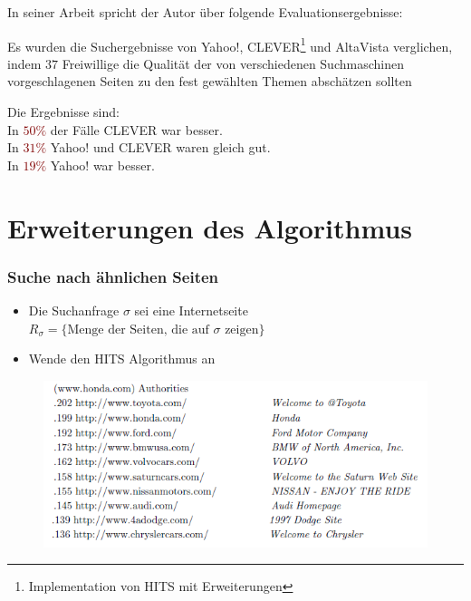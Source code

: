 \documentclass[hyperref={pdfpagelabels=false}]{beamer}
\begin{document}
\begin{frame} [allowframebreaks]
\framebreak 

\fontsize{11pt}{7.2}\selectfont
In seiner Arbeit spricht der Autor über folgende Evaluationsergebnisse:

\vspace{10pt}
Es wurden die Suchergebnisse von Yahoo!, CLEVER\footnote{Implementation von HITS mit Erweiterungen}\cite{CLEVER} und AltaVista\cite{AltaVista} verglichen, indem $37$ Freiwillige die Qualität der von verschiedenen Suchmaschinen vorgeschlagenen Seiten zu den fest gewählten Themen abschätzen sollten

\vspace{10pt}
Die Ergebnisse sind:\\
In \textcolor{maroon}{$50 \%$} der Fälle CLEVER war besser.\\
In \textcolor{maroon}{$31 \%$} Yahoo! und CLEVER waren gleich gut.\\ 
In \textcolor{maroon}{$19 \%$} Yahoo! war besser.\\ 

\end{frame}

\section{Erweiterungen des Algorithmus}

\begin{frame}
\frametitle{Suche nach ähnlichen Seiten}
\begin{itemize}
\item Die Suchanfrage $\sigma$ sei eine Internetseite\\
	\hspace{5pt} $R_\sigma = \{\text{Menge der Seiten, die auf }\sigma  \text{ zeigen}\}$
\item Wende den HITS Algorithmus an
\end{itemize}

\begin{block}{} \begin{figure}
	\includegraphics[scale=0.6]{honda.png}
\end{figure} \end{block}

\end{frame}
\end{document}
